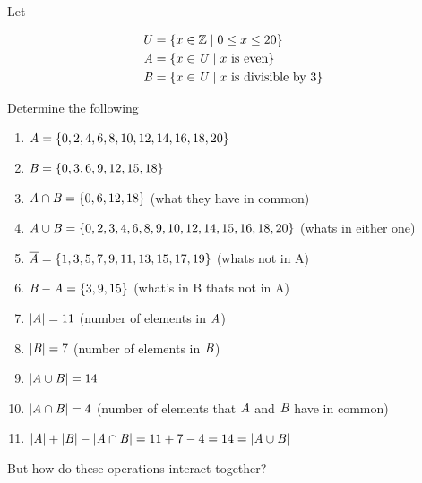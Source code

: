 \documentclass[../../Main.tex]{subfiles}
\begin{document}
\begin{example}
    Let 
    
    \begin{align*}
        \mathit{U} &= \{ x \in \mathbb{Z} \mid 0 \leq x \leq 20 \} \\
        \mathit{A} &= \{ x \in \mathit{U} \mid x \text{ is even} \} \\
        \mathit{B} &= \{ x \in \mathit{U} \mid x \text{ is divisible by 3} \} \\
    \end{align*}

    Determine the following

    \begin{enumerate}
        \item $\mathit{A} = \{ 0, 2, 4, 6, 8, 10, 12, 14, 16, 18, 20 \}$
        \item $\mathit{B} = \{ 0, 3, 6, 9, 12, 15, 18 \}$
        \item $\mathit{A} \cap \mathit{B} = \{ 0, 6, 12, 18 \}$ \; (what they have in common)
        \item $\mathit{A} \cup \mathit{B} = \{ 0, 2, 3, 4, 6, 8, 9, 10, 12, 14, 15, 16, 18, 20 \}$ \; (whats in either one)
        \item $\overline{\mathit{A}} = \{ 1, 3, 5, 7, 9, 11, 13, 15, 17, 19 \}$ \; (whats not in A)
        \item $\mathit{B} - \mathit{A} = \{ 3, 9, 15 \}$ \; (what's in B thats not in A)
        \item $| \mathit{A} | = 11$ \; (number of elements in $\mathit{A}$)
        \item $| \mathit{B} | = 7$ \; (number of elements in $\mathit{B}$)
        \item $| \mathit{A} \cup \mathit{B} | = 14$
        \item $| \mathit{A} \cap \mathit{B} | = 4$ (number of elements that $\mathit{A}$ and $\mathit{B}$ have in common)
        \item $| \mathit{A} | + | \mathit{B} | - | \mathit{A} \cap \mathit{B} | = 11 + 7 - 4 = 14 = | \mathit{A} \cup \mathit{B} |$
    \end{enumerate}
\end{example}

But how do these operations interact together?
\end{document}
